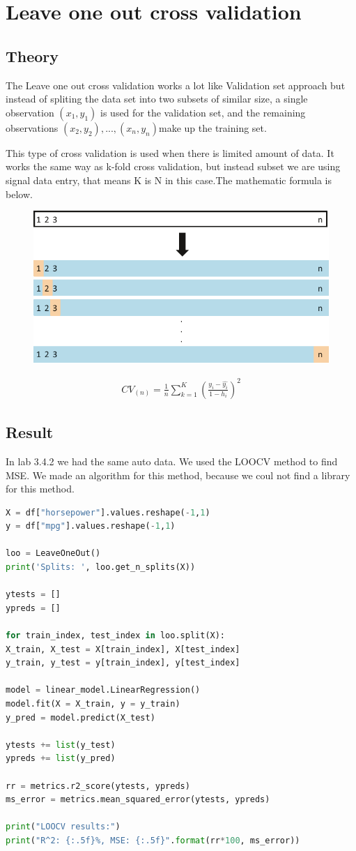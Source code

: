\section {Leave one out cross validation}
\subsection{Theory}
The Leave one out cross validation works a lot like Validation set approach but instead of spliting the data set into two subsets of
similar size, a single observation $(x_1, y_1)$ is used for the validation
set, and the remaining observations ${(x_2, y_2), . . . , (x_n, y_n)}$make up the
training set.

This type of cross validation is used when there is limited amount of data. It works the same way as k-fold cross validation, but instead subset we are using signal data entry, that means K is N in this case.The mathematic formula is below. 

\begin{figure}[H]
	\centering
	\includegraphics[width=0.5\linewidth]{crossValidation/LOOCV}
	\caption{}
	\label{fig:loocv}
\end{figure}


\begin{align}\label{fo:LOOCV}
CV_{(n)} = \frac {1}{n} \sum_{k=1}^{K}  (\frac {y_i-\hat{y_i}}{1- h_i})^2
\end{align}



\subsection{Result}
In lab 3.4.2 we had the same auto data. We used the LOOCV method to find MSE. We made an algorithm for this method, because we coul not find a library for this method.

\begin{lstlisting}[language=Python]
X = df["horsepower"].values.reshape(-1,1)
y = df["mpg"].values.reshape(-1,1) 

loo = LeaveOneOut()
print('Splits: ', loo.get_n_splits(X))

ytests = []
ypreds = []

for train_index, test_index in loo.split(X):
X_train, X_test = X[train_index], X[test_index]
y_train, y_test = y[train_index], y[test_index]

model = linear_model.LinearRegression()
model.fit(X = X_train, y = y_train)
y_pred = model.predict(X_test)

ytests += list(y_test)
ypreds += list(y_pred)

rr = metrics.r2_score(ytests, ypreds)
ms_error = metrics.mean_squared_error(ytests, ypreds)

print("LOOCV results:")
print("R^2: {:.5f}%, MSE: {:.5f}".format(rr*100, ms_error))
\end{lstlisting}

